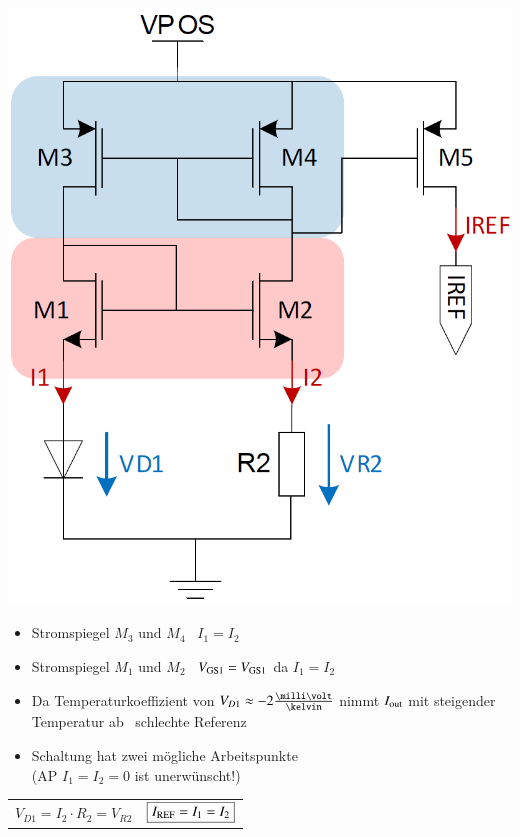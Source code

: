 \begin{minipage}[c]{0.27\columnwidth}
    \includegraphics[width=\columnwidth]{images/bootstrap.png}
\end{minipage}
\hfill
\begin{minipage}[c]{0.71\columnwidth}
    \begin{itemize}
        \item Stromspiegel $M_3$ und $M_4$ \textrightarrow\ $I_1 = I_2$
        \item Stromspiegel $M_1$ und $M_2$ \textrightarrow\ $V_{\rm GS1} = V_{\rm GS1}$ da $I_1 = I_2$
        \item Da Temperaturkoeffizient von $V_{D1} \approx -2 \frac{\milli \volt}{\kelvin}$ nimmt $I_{\rm out}$ 
        mit steigender Temperatur ab \textrightarrow\ schlechte Referenz
        \item Schaltung hat zwei mögliche Arbeitspunkte\\
        (AP $I_1 = I_2 = 0$ ist unerwünscht!)
    \end{itemize}

    \vspace{0.2cm}
    \begin{tabular}{c c}
        $ \boxed{ V_{D1} = I_2 \cdot R_2 = V_{R2}} $ & $ \boxed{ I_{\rm REF} = I_1 = I_2 } $
    \end{tabular}
\end{minipage}


